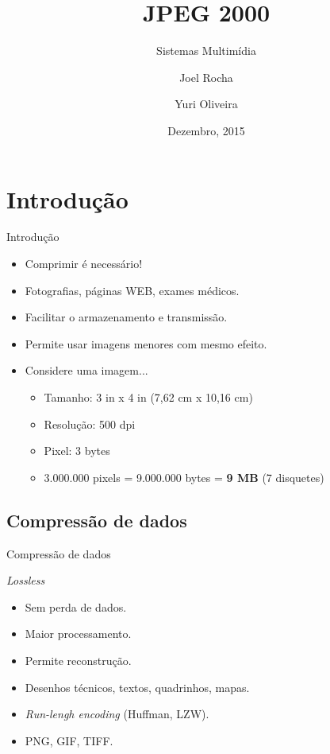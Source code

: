 \documentclass{beamer}
\title{JPEG 2000}
\subtitle{Sistemas Multimídia}
\author[Joel, Yuri]{Joel Rocha \and Yuri Oliveira}
\institute[IFCE]{Instituto Federal de Ciência, Arte e Tecnologia}
\date{Dezembro, 2015}
\begin{document}
  \begin{frame}
    \titlepage
  \end{frame}
  \begin{frame}{\contentsname}
    \tableofcontents
  \end{frame}

  \section{Introdução}
  \begin{frame}{Introdução}
    \begin{block}{}
    \begin{itemize}
      \item Comprimir é necessário!
      \item Fotografias, páginas WEB, exames médicos.
      \item Facilitar o armazenamento e transmissão.
      \item Permite usar imagens menores com mesmo efeito.
      \item Considere uma imagem...
      \begin{itemize}
        \item Tamanho: 3 in x 4 in (7,62 cm x 10,16 cm)
        \item Resolução: 500 dpi
        \item Pixel: 3 bytes
        \item 3.000.000 pixels = 9.000.000 bytes = \textbf{9 MB} (7 disquetes)
      \end{itemize}
    \end{itemize}
    \end{block}
  \end{frame}

  \subsection{Compressão de dados}
  \begin{frame}{Compressão de dados}
    \begin{block}{\textit{Lossless}}
      \begin{itemize}
        \item Sem perda de dados.
        \item Maior processamento.
        \item Permite reconstrução.
        \item Desenhos técnicos, textos, quadrinhos, mapas.
        \item \emph{Run-lengh encoding} (Huffman, LZW).
        \item PNG, GIF, TIFF.
      \end{itemize}
    \end{block}
  \end{frame}
\end{document}
